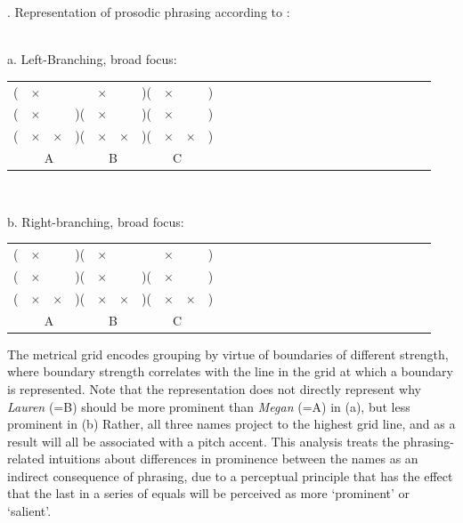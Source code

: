 \documentclass[preprint,review,12pt,authoryear,times]{elsarticle}
\newcommand{\g}{$\times$}
\begin{document}
\ex. Representation of prosodic phrasing according to  \citet{wagner05recursion,wagner10nllt}:\\\label{phraspromYo}
\vspace{-10pt}
\ \\
\parbox{2in}{\footnotesize a. Left-Branching, broad focus:\\
\vspace{-12pt}
\setlength{\unitlength}{1cm}
\setlength\extrarowheight{-3pt}
 \begin{tabular}{ccccccccccccccccccccccccccc}
(&\g&&&\g&&)(&\g&&)&\\
(&\g&&)(&\g&&)(&\g&&)&\\
(&\g&\g&)(&\g&\g&)(&\g&\g&)&\\
\multicolumn{4}{c}{A}&\multicolumn{2}{c}{B}&\multicolumn{4}{c}{C}\\
\end{tabular}
}\parbox{0,45in}{\ }\parbox{2in}{\footnotesize b. Right-branching, broad focus:\\
\vspace{-12pt}
\setlength{\unitlength}{1cm}
\setlength\extrarowheight{-3pt}
\begin{tabular}{ccccccccccccccccccccccccccc}
(&\g&&)(&\g&&&\g&&)&\\
(&\g&&)(&\g&&)(&\g&&)&\\
(&\g&\g&)(&\g&\g&)(&\g&\g&)&\\
\multicolumn{4}{c}{A}&\multicolumn{2}{c}{B}&\multicolumn{4}{c}{C}\\
\end{tabular}
}\label{libhi}


\noindent The metrical grid encodes grouping by virtue of boundaries of different strength, where boundary strength correlates with the line in the grid at which a boundary is represented. Note that the representation does not directly represent why {\em Lauren} (=B) should be more prominent than {\em Megan} (=A)  in (a), but less  prominent in (b) Rather, all three names project to the highest grid line, and as a result will all be associated with a pitch accent. This analysis treats the phrasing-related intuitions about differences in prominence between the names as an indirect consequence of phrasing, due to a perceptual principle that has the effect that the last in a series of equals will be perceived as more `prominent' or `salient'. 
\end{document}
